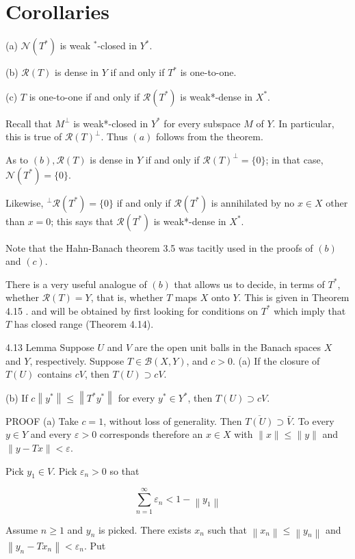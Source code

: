 \documentclass[10pt]{article}
\begin{document}
\section{Corollaries}
(a) $\mathcal{N}\left(T^{*}\right)$ is weak ${ }^{*}$-closed in $Y^{*}$.

(b) $\mathscr{R}(T)$ is dense in $Y$ if and only if $T^{*}$ is one-to-one.

(c) $T$ is one-to-one if and only if $\mathscr{R}\left(T^{*}\right)$ is weak*-dense in $X^{*}$.

Recall that $M^{\perp}$ is weak*-closed in $Y^{*}$ for every subspace $M$ of $Y$. In particular, this is true of $\mathscr{R}(T)^{\perp}$. Thus $(a)$ follows from the theorem.

As to $(b), \mathscr{R}(T)$ is dense in $Y$ if and only if $\mathscr{R}(T)^{\perp}=\{0\}$; in that case, $\mathscr{N}\left(T^{*}\right)=\{0\}$.

Likewise, ${ }^{\perp} \mathscr{R}\left(T^{*}\right)=\{0\}$ if and only if $\mathscr{R}\left(T^{*}\right)$ is annihilated by no $x \in X$ other than $x=0$; this says that $\mathscr{R}\left(T^{*}\right)$ is weak*-dense in $X^{*}$.

Note that the Hahn-Banach theorem 3.5 was tacitly used in the proofs of $(b)$ and $(c)$.

There is a very useful analogue of $(b)$ that allows us to decide, in terms of $T^{*}$, whether $\mathscr{R}(T)=Y$, that is, whether $T$ maps $X$ onto $Y$. This is given in Theorem 4.15 . and will be obtained by first looking for conditions on $T^{*}$ which imply that $T$ has closed range (Theorem 4.14).

4.13 Lemma Suppose $U$ and $V$ are the open unit balls in the Banach spaces $X$ and $Y$, respectively. Suppose $T \in \mathscr{B}(X, Y)$, and $c>0$.
(a) If the closure of $T(U)$ contains $c V$, then $T(U) \supset c V$.

(b) If $c\left\|y^{*}\right\| \leq\left\|T^{*} y^{*}\right\|$ for every $y^{*} \in Y^{*}$, then $T(U) \supset c V$.

PROOF (a) Take $c=1$, without loss of generality. Then $\overline{T(U)} \supset \bar{V}$. To every $y \in Y$ and every $\varepsilon>0$ corresponds therefore an $x \in X$ with $\|x\| \leq\|y\|$ and $\|y-T x\|<\varepsilon$.

Pick $y_{1} \in V$. Pick $\varepsilon_{n}>0$ so that

$$
\sum_{n=1}^{\infty} \varepsilon_{n}<1-\left\|y_{1}\right\|
$$

Assume $n \geq 1$ and $y_{n}$ is picked. There exists $x_{n}$ such that $\left\|x_{n}\right\| \leq\left\|y_{n}\right\|$ and
$\left\|y_{n}-T x_{n}\right\|<\varepsilon_{n}$. Put
\end{document}
